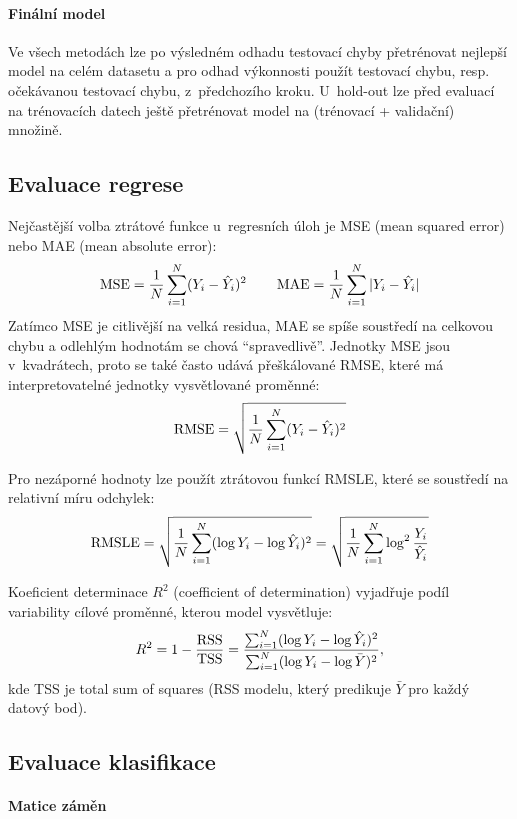 \paragraph{Finální model} Ve všech metodách lze po výsledném odhadu testovací chyby přetrénovat nejlepší model na celém datasetu a pro odhad výkonnosti použít testovací chybu, resp. očekávanou testovací chybu, z~předchozího kroku. U~hold-out lze před evaluací na trénovacích datech ještě přetrénovat model na (trénovací + validační) množině.

\subsection{Evaluace regrese}

Nejčastější volba ztrátové funkce u~regresních úloh je MSE (mean squared error) nebo MAE (mean absolute error):
\[
    \operatorname{MSE} = \frac{1}{N} \sum_{i=1}^{N} (Y_i - \hat{Y}_i)^2
    \qquad
    \operatorname{MAE} = \frac{1}{N} \sum_{i=1}^{N} |Y_i - \hat{Y}_i|
\]
Zatímco MSE je citlivější na velká residua, MAE se spíše soustředí na celkovou chybu a odlehlým hodnotám se chová ``spravedlivě''. Jednotky MSE jsou v~kvadrátech, proto se také často udává přeškálované RMSE, které má interpretovatelné jednotky vysvětlované proměnné:
\[
    \operatorname{RMSE} = \sqrt{\frac{1}{N} \sum_{i=1}^{N} (Y_i - \hat{Y}_i)^2}
\]

Pro nezáporné hodnoty lze použít ztrátovou funkcí RMSLE, které se soustředí na relativní míru odchylek:
\[
    \operatorname{RMSLE} = \sqrt{\frac{1}{N} \sum_{i=1}^{N} (\log Y_i - \log \hat{Y}_i)^2}
    = \sqrt{\frac{1}{N} \sum_{i=1}^{N} \log^2 \frac{Y_i}{\hat{Y}_i}}
\]

Koeficient determinace $R^2$ (coefficient of determination) vyjadřuje podíl variability cílové proměnné, kterou model vysvětluje:
\[
    R^2 = 1 - \frac{\operatorname{RSS}}{\operatorname{TSS}}
    = \frac{
        \sum_{i=1}^{N} (\log Y_i - \log \hat{Y}_i)^2
    }{
        \sum_{i=1}^{N} (\log Y_i - \log \bar{Y})^2
    },
\]
kde TSS je total sum of squares (RSS modelu, který predikuje $\bar{Y}$ pro každý datový bod).

\subsection{Evaluace klasifikace}

\paragraph{Matice záměn}

